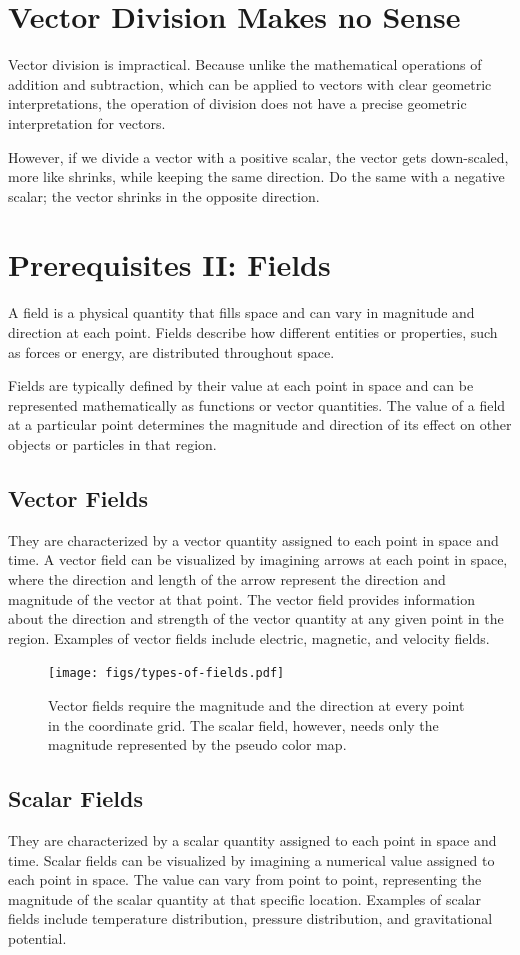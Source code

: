 \documentclass[12pt,b4paper]{article}
\begin{document}
\section*{Vector Division Makes no Sense}
Vector division is impractical. Because unlike the mathematical operations of addition and subtraction, which can be applied to vectors with clear geometric interpretations, the operation of division does not have a precise geometric interpretation for vectors.

However, if we divide a vector with a positive scalar, the vector gets down-scaled, more like shrinks, while keeping the same direction. Do the same with a negative scalar; the vector shrinks in the opposite direction.
\thispagestyle{empty}
\section*{Prerequisites II: Fields}
A field is a physical quantity that fills space and can vary in magnitude and direction at each point. Fields describe how different entities or properties, such as forces or energy, are distributed throughout space.

Fields are typically defined by their value at each point in space and can be represented mathematically as functions or vector quantities. The value of a field at a particular point determines the magnitude and direction of its effect on other objects or particles in that region.
\subsection*{Vector Fields}
They are characterized by a vector quantity assigned to each point in space and time. A vector field can be visualized by imagining arrows at each point in space, where the direction and length of the arrow represent the direction and magnitude of the vector at that point. The vector field provides information about the direction and strength of the vector quantity at any given point in the region. Examples of vector fields include electric, magnetic, and velocity fields.
\begin{figure}[H]
    \centering
    \texttt{[image: figs/types-of-fields.pdf]}
    \caption{Vector fields require the magnitude and the direction at every point in the coordinate grid. The scalar field, however, needs only the magnitude represented by the pseudo color map.}
    \label{fig:fields-def}
\end{figure}
\subsection*{Scalar Fields}
They are characterized by a scalar quantity assigned to each point in space and time. Scalar fields can be visualized by imagining a numerical value assigned to each point in space. The value can vary from point to point, representing the magnitude of the scalar quantity at that specific location. Examples of scalar fields include temperature distribution, pressure distribution, and gravitational potential.
\thispagestyle{empty}
\end{document}
